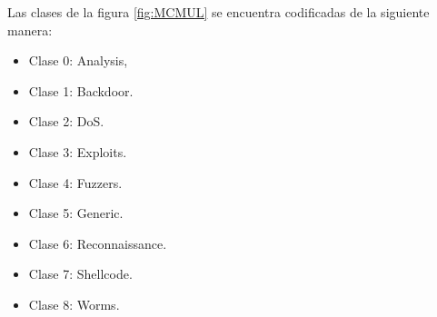 Las clases de la figura \ref{fig:MCMUL} se encuentra codificadas de la siguiente manera:

\begin{itemize}
	\item Clase 0: Analysis,
	\item Clase 1: Backdoor.
	\item Clase 2: DoS.
	\item Clase 3: Exploits. 
	\item Clase 4: Fuzzers.
	\item Clase 5: Generic.
	\item Clase 6: Reconnaissance.
	\item Clase 7: Shellcode.
	\item Clase 8: Worms.
\end{itemize}

